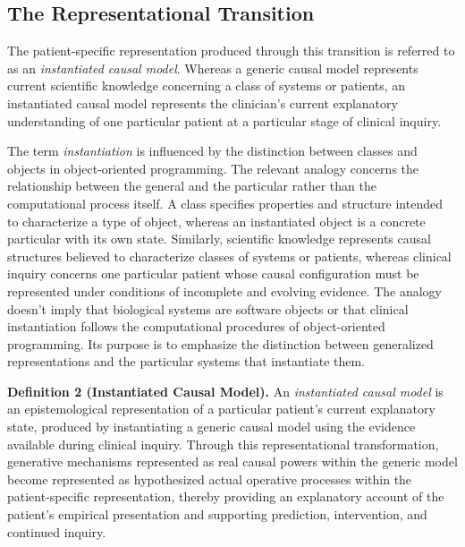 \documentclass[11pt]{article}
\begin{document}
\subsection{The Representational Transition}

The patient-specific representation produced through this transition is referred to as an \emph{instantiated causal model}. Whereas a generic causal model represents current scientific knowledge concerning a class of systems or patients, an instantiated causal model represents the clinician's current explanatory understanding of one particular patient at a particular stage of clinical inquiry.

The term \emph{instantiation} is influenced by the distinction between classes and objects in object-oriented programming. The relevant analogy concerns the relationship between the general and the particular rather than the computational process itself. A class specifies properties and structure intended to characterize a type of object, whereas an instantiated object is a concrete particular with its own state. Similarly, scientific knowledge represents causal structures believed to characterize classes of systems or patients, whereas clinical inquiry concerns one particular patient whose causal configuration must be represented under conditions of incomplete and evolving evidence. The analogy doesn't imply that biological systems are software objects or that clinical instantiation follows the computational procedures of object-oriented programming. Its purpose is to emphasize the distinction between generalized representations and the particular systems that instantiate them.

\medskip

\noindent\textbf{Definition 2 (Instantiated Causal Model).}
An \emph{instantiated causal model} is an epistemological representation of a particular patient’s current explanatory state, produced by instantiating a generic causal model using the evidence available during clinical inquiry. Through this representational transformation, generative mechanisms represented as real causal powers \parencite{mumford_getting_2011} within the generic model become represented as hypothesized actual operative processes within the patient-specific representation, thereby providing an explanatory account of the patient’s empirical presentation and supporting prediction, intervention, and continued inquiry.
\end{document}

